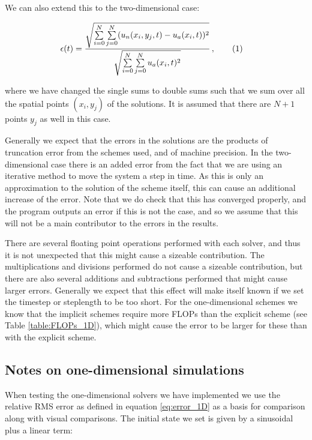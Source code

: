 \documentclass[reprint,english,notitlepage]{revtex4-1}  %
\newcommand\numberthis{\addtocounter{equation}{1}\tag{\theequation}}
\begin{document}
We can also extend this to the two-dimensional case:

\begin{align*}
\epsilon(t) &= \frac{\sqrt{\sum\limits_{i=0}^N \sum\limits_{j=0}^N (u_n(x_i,y_j,t) - u_a(x_i,t))^2}}{\sqrt{\sum\limits_{i=0}^N \sum\limits_{j=0}^N u_a(x_i,t)^2}} \, , \numberthis \label{eq:error_2D}
\end{align*}

where we have changed the single sums to double sums such that we sum over all the spatial points $(x_i,y_j)$ of the solutions. It is assumed that there are $N+1$ points $y_j$ as well in this case.

Generally we expect that the errors in the solutions are the products of truncation error from the schemes used, and of machine precision. In the two-dimensional case there is an added error from the fact that we are using an iterative method to move the system a step in time. As this is only an approximation to the solution of the scheme itself, this can cause an additional increase of the error. Note that we do check that this has converged properly, and the program outputs an error if this is not the case, and so we assume that this will not be a main contributor to the errors in the results.

There are several floating point operations performed with each solver, and thus it is not unexpected that this might cause a sizeable contribution. The multiplications and divisions performed do not cause a sizeable contribution, but there are also several additions and subtractions performed that might cause larger errors. Generally we expect that this effect will make itself known if we set the timestep or steplength to be too short. For the one-dimensional schemes we know that the implicit schemes require more FLOPs than the explicit scheme (see Table \ref{table:FLOPs_1D}), which might cause the error to be larger for these than with the explicit scheme. 





\subsection{Notes on one-dimensional simulations} \label{sec:method_1D_sims}

When testing the one-dimensional solvers we have implemented we use the relative RMS error as defined in equation \eqref{eq:error_1D} as a basis for comparison along with visual comparisons. The initial state we set is given by a sinusoidal plus a linear term:
\end{document}
